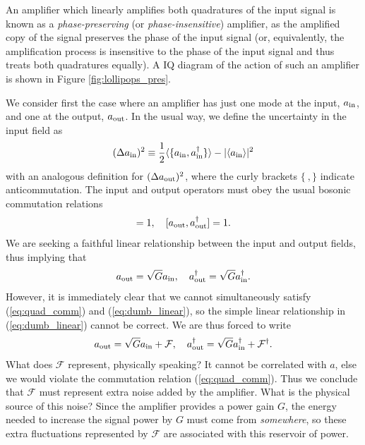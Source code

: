 An amplifier which linearly amplifies both quadratures of the input signal is known as a \textit{phase-preserving} (or \textit{phase-insensitive}) amplifier, as the amplified copy of the signal preserves the phase of the input signal (or, equivalently, the amplification process is insensitive to the phase of the input signal and thus treats both quadratures equally).  A IQ diagram of the action of such an amplifier is shown in Figure \ref{fig:lollipops_pres}.

We consider first the case where an amplifier has just one mode at the input, $a_{\rm in}$, and one at the output, $a_{\rm out}$.  In the usual way, we define the uncertainty in the input field as
\begin{equation}
(\Delta a_{\rm in})^2 \equiv \frac{1}{2} \langle \{a_{\rm in},a_{\rm in}^\dagger \} \rangle - | \langle a_{\rm in} \rangle |^2
\label{eq:gen_uncert}
\end{equation}
with an analogous definition for $(\Delta a_{\rm out})^2$, where the curly brackets $\{~,\}$ indicate anticommutation.  The input and output operators must obey the usual bosonic commutation relations
\begin{equation}
[a_{\rm in},a_{\rm in}^\dagger] = 1, \quad [a_{\rm out},a_{\rm out}^\dagger] = 1.
\label{eq:quad_comm}
\end{equation}
We are seeking a faithful linear relationship between the input and output fields, thus implying that
\begin{equation}
a_{\rm out} = \sqrt{G} a_{\rm in}, \quad a_{\rm out}^\dagger = \sqrt{G} a_{\rm in}^\dagger.
\label{eq:dumb_linear}
\end{equation}
However, it is immediately clear that we cannot simultaneously satisfy (\ref{eq:quad_comm}) and (\ref{eq:dumb_linear}), so the simple linear relationship in (\ref{eq:dumb_linear}) cannot be correct.  We are thus forced to write
\begin{equation}
a_{\rm out} = \sqrt{G} a_{\rm in} + \mathcal{F}, \quad a_{\rm out}^\dagger = \sqrt{G} a_{\rm in}^\dagger + \mathcal{F}^\dagger.
\label{eq:linear_wF}
\end{equation}
What does $\mathcal{F}$ represent, physically speaking?  It cannot be correlated with $a$, else we would violate the commutation relation (\ref{eq:quad_comm}).  Thus we conclude that $\mathcal{F}$ must represent extra noise added by the amplifier.  What is the physical source of this noise?  Since the amplifier provides a power gain $G$, the energy needed to increase the signal power by $G$ must come from \textit{somewhere}, so these extra fluctuations represented by $\mathcal{F}$ are associated with this reservoir of power.

